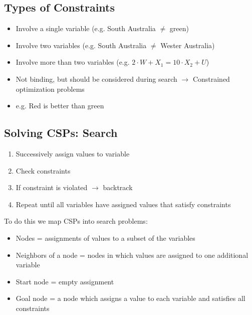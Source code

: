 \documentclass[
../EiKI_Summary.tex,
]
{subfiles}
\begin{document}
\subsection{Types of Constraints}
\begin{itemize}
    \item {} Involve a single variable (e.g. South Australia $\not=$ green)
    \item {} Involve two variables (e.g. South Australia $\not=$ Wester Australia)
    \item {} Involve more than two variables (e.g. $2\cdot W + X_1 = 10 \cdot X_2 + U$)
\end{itemize}

\begin{itemize}
    \item Not binding, but should be considered during search 
    \subitem $\rightarrow$ Constrained optimization problems
    \item e.g. Red is better than green
\end{itemize}

\subsection{Solving CSPs: Search}
\begin{enumerate}
    \item Successively assign values to variable
    \item Check constraints
    \item If constraint is violated $\rightarrow$ backtrack
    \item Repeat until all variables have assigned values that satisfy constraints
\end{enumerate}

To do this we map CSPs into search problems:
\begin{itemize}
    \item Nodes = assignments of values to a subset of the variables
    \item Neighbors of a node = nodes in which values are assigned to one additional variable
    \item Start node = empty assignment
    \item Goal node = a node which assigns a value to each variable and satisfies all constraints
\end{itemize}
\end{document}
